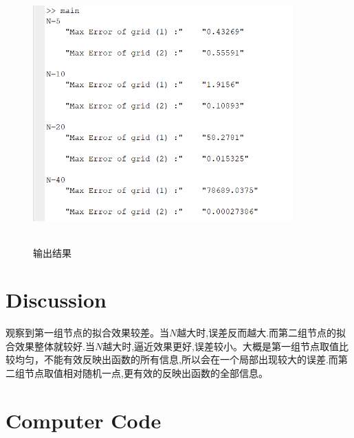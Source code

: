 \documentclass{article}
\begin{document}
	\begin{figure}[p]
		\begin{center}
			
			\includegraphics[width=10cm,height=10cm]{result}
			
			\caption{输出结果} \label{figure.label}
		\end{center}
	\end{figure}
	
	
	\section{Discussion}
	
	
	观察到第一组节点的拟合效果较差。当$N$越大时,误差反而越大.而第二组节点的拟合效果整体就较好.当$N$越大时,逼近效果更好,误差较小。大概是第一组节点取值比较均匀，不能有效反映出函数的所有信息,所以会在一个局部出现较大的误差.而第二组节点取值相对随机一点,更有效的反映出函数的全部信息。
	
	\section{Computer Code}
	
	
	
	
\end{document}
